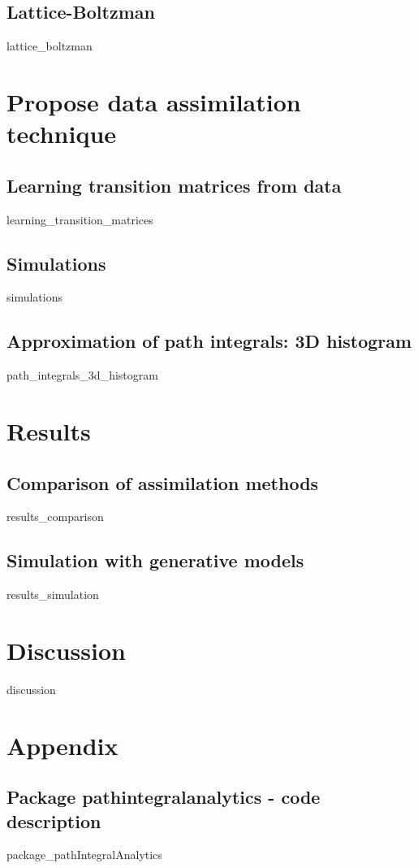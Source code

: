 \documentclass[10pt,a4paper]{report}
\begin{document}
\section{Lattice-Boltzman}
	{lattice_boltzman}



\chapter{Propose data assimilation technique}

\section{Learning transition matrices from data}
	{learning_transition_matrices}

\section{Simulations}
	{simulations}

\section{Approximation of path integrals: 3D histogram}
	{path_integrals_3d_histogram}
	


\chapter{Results}

\section{Comparison of assimilation methods}
	{results_comparison}

\section{Simulation with generative models}
	{results_simulation}



\chapter{Discussion}

	{discussion}



\chapter{Appendix}

\section{Package pathintegralanalytics - code description}
	{package_pathIntegralAnalytics}
\end{document}
